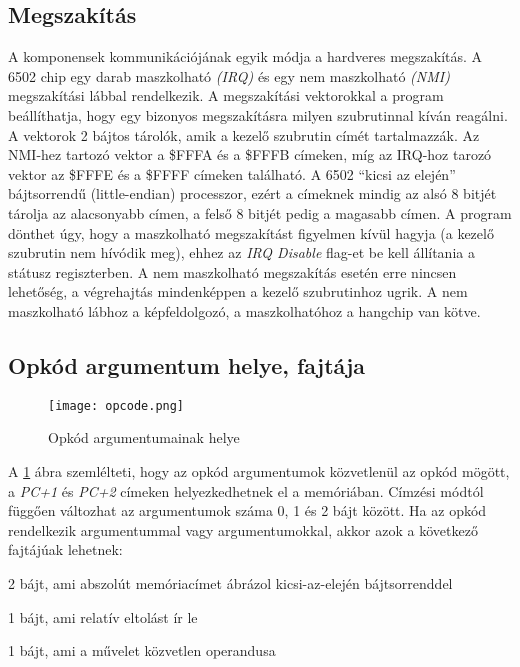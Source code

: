 \subsection{Megszakítás}
A komponensek kommunikációjának egyik módja a hardveres megszakítás.
A 6502 chip egy darab maszkolható \emph{(IRQ)} és egy nem maszkolható \emph{(NMI)} megszakítási lábbal rendelkezik.
A megszakítási vektorokkal a program beállíthatja, hogy egy bizonyos megszakításra milyen szubrutinnal kíván reagálni. A vektorok 2 bájtos tárolók, amik a kezelő szubrutin címét tartalmazzák. Az NMI-hez tartozó vektor a \$FFFA és a \$FFFB címeken, míg az IRQ-hoz tarozó vektor az \$FFFE és a \$FFFF címeken található. A 6502 ``kicsi az elején'' bájtsorrendű (little-endian) processzor, ezért a címeknek mindig az alsó 8 bitjét tárolja az alacsonyabb címen, a felső 8 bitjét pedig a magasabb címen.
A program dönthet úgy, hogy a maszkolható megszakítást figyelmen kívül hagyja (a kezelő szubrutin nem hívódik meg), ehhez az \emph{IRQ Disable} flag-et be kell állítania a státusz regiszterben. A nem maszkolható megszakítás esetén erre nincsen lehetőség, a végrehajtás mindenképpen a kezelő szubrutinhoz ugrik.
A nem maszkolható lábhoz a képfeldolgozó, a maszkolhatóhoz a hangchip van kötve.

\subsection{Opkód argumentum helye, fajtája}

\begin{figure}[H]
	\centering
	\texttt{[image: opcode.png]}
	\caption{Opkód argumentumainak helye}
	\label{fig:argplacement}
\end{figure}

A \ref{fig:argplacement} ábra szemlélteti, hogy az opkód argumentumok közvetlenül az opkód mögött, a \emph{PC+1} és \emph{PC+2} címeken helyezkedhetnek el a memóriában. Címzési módtól függően változhat az argumentumok száma 0, 1 és 2 bájt között.
Ha az opkód rendelkezik argumentummal vagy argumentumokkal, akkor azok a következő fajtájúak lehetnek:

\begin{compactitem}
	\item 2 bájt, ami abszolút memóriacímet ábrázol kicsi-az-elején bájtsorrenddel 
	\item 1 bájt, ami relatív eltolást ír le
	\item 1 bájt, ami a művelet közvetlen operandusa
\end{compactitem}


